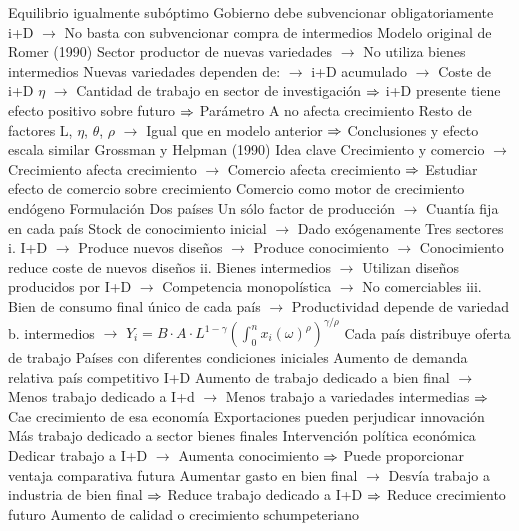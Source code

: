 \documentclass{nuevotema}
\begin{document}
\begin{esquemal}
				\4[] Equilibrio igualmente subóptimo
				\4[] Gobierno debe subvencionar obligatoriamente i+D
				\4[] $\to$ No basta con subvencionar compra de intermedios
				\4 Modelo original de Romer (1990)
				\4[] Sector productor de nuevas variedades
				\4[] $\to$ No utiliza bienes intermedios
				\4[] Nuevas variedades dependen de:
				\4[] $\to$ i+D acumulado
				\4[] $\to$ Coste de i+D $\eta$
				\4[] $\to$ Cantidad de trabajo en sector de investigación
				\4[] $\Rightarrow$ i+D presente tiene efecto positivo sobre futuro
				\4[] $\Rightarrow$ Parámetro A no afecta crecimiento
				\4[] Resto de factores L, $\eta$, $\theta$, $\rho$
				\4[] $\to$ Igual que en modelo anterior
				\4[] $\Rightarrow$ Conclusiones y efecto escala similar
			\3 Grossman y Helpman (1990)
				\4 Idea clave
				\4[] Crecimiento y comercio
				\4[] $\to$ Crecimiento afecta crecimiento
				\4[] $\to$ Comercio afecta crecimiento
				\4[] $\Rightarrow$ Estudiar efecto de comercio sobre crecimiento
				\4[] Comercio como motor de crecimiento endógeno
				\4 Formulación
				\4[] Dos países
				\4[] Un sólo factor de producción
				\4[] $\to$ Cuantía fija en cada país
				\4[] Stock de conocimiento inicial
				\4[] $\to$ Dado exógenamente
				\4[] Tres sectores
				\4[] i. I+D
				\4[] $\to$ Produce nuevos diseños
				\4[] $\to$ Produce conocimiento
				\4[] $\to$ Conocimiento reduce coste de nuevos diseños
				\4[] ii. Bienes intermedios
				\4[] $\to$ Utilizan diseños producidos por I+D
				\4[] $\to$ Competencia monopolística
				\4[] $\to$ No comerciables
				\4[] iii. Bien de consumo final único de cada país
				\4[] $\to$ Productividad depende de variedad b. intermedios
				\4[] $\to$ $Y_i = B \cdot A \cdot L^{1-\gamma} \left(\int_0^n x_i(\omega)^\rho  \right)^{\gamma/\rho}$
				\4[] Cada país distribuye oferta de trabajo
				\4[] Países con diferentes condiciones iniciales
				\4 Aumento de demanda relativa país competitivo I+D
				\4[] Aumento de trabajo dedicado a bien final
				\4[] $\to$ Menos trabajo dedicado a I+d
				\4[] $\to$ Menos trabajo a variedades intermedias
				\4[] $\Rightarrow$ Cae crecimiento de esa economía
				\4 Exportaciones pueden perjudicar innovación
				\4[] Más trabajo dedicado a sector bienes finales
				\4 Intervención política económica
				\4[] Dedicar trabajo a I+D
				\4[] $\to$ Aumenta conocimiento
				\4[] $\Rightarrow$ Puede proporcionar ventaja comparativa futura
				\4[] Aumentar gasto en bien final
				\4[] $\to$ Desvía trabajo a industria de bien final
				\4[] $\Rightarrow$ Reduce trabajo dedicado a I+D
				\4[] $\Rightarrow$ Reduce crecimiento futuro
		\2 Aumento de calidad o crecimiento schumpeteriano

\end{esquemal}
\end{document}
